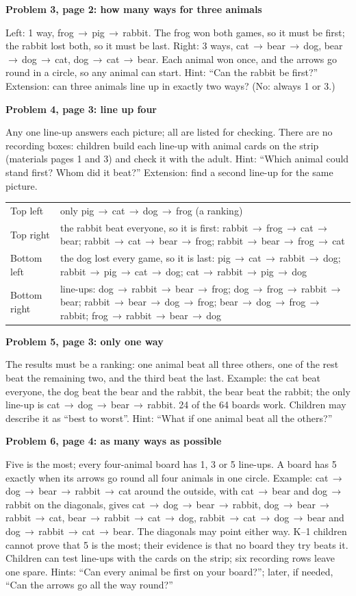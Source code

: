 \documentclass[11pt]{article}
\newcommand{\sub}[1]{\par\needspace{3\baselineskip}\textbf{#1}\par}
\newcommand{\bt}{\,$\to$\,\allowbreak}
\begin{document}
\sub{Problem 3, page 2: how many ways for three animals}
Left: 1 way, frog\bt pig\bt rabbit. The frog won both games, so it must be first; the rabbit lost both, so it must be last. Right: 3 ways, cat\bt bear\bt dog, bear\bt dog\bt cat, dog\bt cat\bt bear. Each animal won once, and the arrows go round in a circle, so any animal can start. Hint: ``Can the rabbit be first?'' Extension: can three animals line up in exactly two ways? (No: always 1 or 3.)

\sub{Problem 4, page 3: line up four}
Any one line-up answers each picture; all are listed for checking. There are no recording boxes: children build each line-up with animal cards on the strip (materials pages 1 and 3) and check it with the adult. Hint: ``Which animal could stand first? Whom did it beat?'' Extension: find a second line-up for the same picture.\par
{\renewcommand{\arraystretch}{1.15}\begin{tabular}{@{}l>{\raggedright\arraybackslash}p{14.6cm}@{}}
Top left & only pig\bt cat\bt dog\bt frog (a ranking)\\
Top right & the rabbit beat everyone, so it is first: rabbit\bt frog\bt cat\bt bear; rabbit\bt cat\bt bear\bt frog; rabbit\bt bear\bt frog\bt cat\\
Bottom left & the dog lost every game, so it is last: pig\bt cat\bt rabbit\bt dog; rabbit\bt pig\bt cat\bt dog; cat\bt rabbit\bt pig\bt dog\\
Bottom right & 5 line-ups: dog\bt rabbit\bt bear\bt frog; dog\bt frog\bt rabbit\bt bear; rabbit\bt bear\bt dog\bt frog; bear\bt dog\bt frog\bt rabbit; frog\bt rabbit\bt bear\bt dog
\end{tabular}}

\sub{Problem 5, page 3: only one way}
The results must be a ranking: one animal beat all three others, one of the rest beat the remaining two, and the third beat the last. Example: the cat beat everyone, the dog beat the bear and the rabbit, the bear beat the rabbit; the only line-up is cat\bt dog\bt bear\bt rabbit. 24 of the 64 boards work. Children may describe it as ``best to worst''. Hint: ``What if one animal beat all the others?''

\sub{Problem 6, page 4: as many ways as possible}
Five is the most; every four-animal board has 1, 3 or 5 line-ups. A board has 5 exactly when its arrows go round all four animals in one circle. Example: cat\bt dog\bt bear\bt rabbit\bt cat around the outside, with cat\bt bear and dog\bt rabbit on the diagonals, gives cat\bt dog\bt bear\bt rabbit, dog\bt bear\bt rabbit\bt cat, bear\bt rabbit\bt cat\bt dog, rabbit\bt cat\bt dog\bt bear and dog\bt rabbit\bt cat\bt bear. The diagonals may point either way. K--1 children cannot prove that 5 is the most; their evidence is that no board they try beats it. Children can test line-ups with the cards on the strip; six recording rows leave one spare. Hints: ``Can every animal be first on your board?''; later, if needed, ``Can the arrows go all the way round?''
\end{document}
